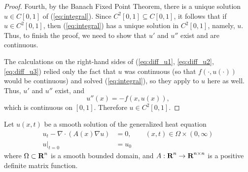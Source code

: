 \documentclass{homework}
\begin{document}
\begin{enumerate}[label=\textbf{(\roman*)}]
\begin{proof}
			Fourth, by the Banach Fixed Point Theorem, there is a unique solution $u \in C[0,1]$ of (\ref{eq:integral}). Since $C^2[0,1] \subseteq C[0,1]$, it follows that if $u \in C^2[0,1]$, then (\ref{eq:integral}) has a unique solution in $C^2[0,1]$, namely, $u$. Thus, to finish the proof, we need to show that $u'$ and $u''$ exist and are continuous.
			
			The calculations on the right-hand sides of (\ref{eq:diff_u1}, \ref{eq:diff_u2}, \ref{eq:diff_u3}) relied only the fact that $u$ was continuous (so that $f(\cdot, u(\cdot))$ would be continuous) and solved (\ref{eq:integral}), so they apply to $u$ here as well. Thus, $u'$ and $u''$ exist, and
			\begin{equation}
				u''(x) = -f(x, u(x)),
			\end{equation}
			which is continuous on $[0,1]$. Therefore $u \in C^2[0,1]$.
		\end{proof}
	\end{enumerate}
	
	\question Let $u(x,t)$ be a smooth solution of the generalized heat equation
	\begin{equation}
		\label{eq:generalized_heat}
		\begin{aligned}
			u_t - \nabla \cdot (A(x) \nabla u) &= 0, \qquad (x,t) \in \Omega\times(0,\infty) \\
			u \big\vert_{t=0} &= u_0
		\end{aligned}
	\end{equation}
	where $\Omega \subset \textbf{R}^n$ is a smooth bounded domain, and $A : \textbf{R}^n \to \textbf{R}^{n\times n}$ is a positive definite matrix function.
	
\end{document}
